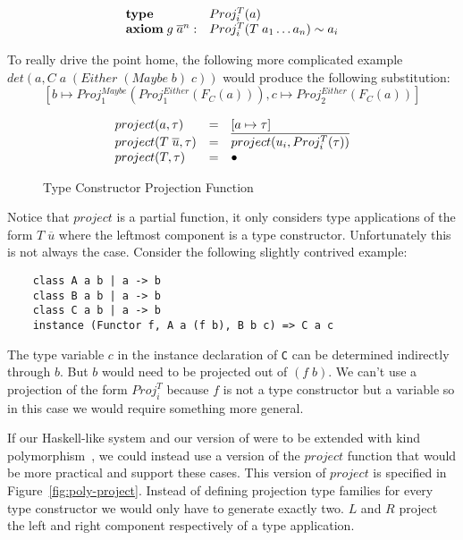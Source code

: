 \[
\begin{array}{l l}
  \textbf{type} \; &Proj^T_i(a)
  \\
  \textbf{axiom} \; g \; \overline{a}^n : &Proj^T_i(T \; a_1 \mathellipsis a_n)
  \sim a_i
\end{array}
\]

To really drive the point home, the following more complicated example $det(a, C
\; a \; (Either \; (Maybe \; b) \; c) )$ would produce the following
substitution:
\[
[ b \mapsto Proj^{Maybe}_1(Proj^{Either}_1(F_C(a))), c \mapsto
Proj^{Either}_2(F_C(a))]
\]

\begin{figure}
\[
\begin{array}{l c l}
    project(a, \tau) & = & [a \mapsto \tau]
    \\
    project(T \; \overline{u}, \tau) & = &
    \overline{project(u_i, Proj^T_i(\tau))}
    \\
    project(T, \tau) & = & \bullet
\end{array}
\]
\caption{Type Constructor Projection Function}
\label{fig:project}
\end{figure}

Notice that $project$ is a partial function, it only considers type applications
of the form $T \; \overline{u}$ where the leftmost component is a type
constructor. Unfortunately this is not always the case. Consider the following
slightly contrived example:

\begin{verbatim}
    class A a b | a -> b
    class B a b | a -> b
    class C a b | a -> b
    instance (Functor f, A a (f b), B b c) => C a c
\end{verbatim}

The type variable $c$ in the instance declaration of \texttt{C} can be
determined indirectly through $b$. But $b$ would need to be projected out of $(f
\; b)$. We can't use a projection of the form $Proj^T_i$ because $f$ is not a
type constructor but a variable so in this case we would require something more
general.

If our Haskell-like system and our version of \systemfc were to be extended
with kind polymorphism~\cite{yorgey}, we could instead use a version of the
$project$ function that would be more practical and support these cases. This
version of $project$ is specified in Figure~\ref{fig:poly-project}. Instead of
defining projection type families for every type constructor we would only have
to generate exactly two. $L$ and $R$ project the left and right component
respectively of a type application.

